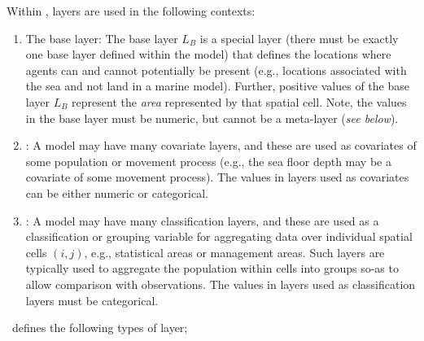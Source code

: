 Within \IBM, layers are used in the following contexts:
\begin{enumerate}
	\item The base layer: The base layer $L_B$ is a special layer (there must be exactly one base layer defined within the model) that defines the locations where agents can and cannot potentially be present (e.g., locations associated with the sea and not land in a marine model). Further, positive values of the base layer $L_B$ represent the \emph{area} represented by that spatial cell. Note, the values in the base layer must be numeric, but cannot be a meta-layer (\emph{see below}).
	\item {}: A model may have many covariate layers, and these are used as covariates of some population or movement process (e.g., the sea floor depth may be a covariate of some movement process). The values in layers used as covariates can be either numeric or categorical.
	\item {}: A model may have many classification layers, and these are used as a classification or grouping variable for aggregating data over individual spatial cells $(i,j)$, e.g., statistical areas or management areas. Such layers are typically used to aggregate the population within cells into groups so-as to allow comparison with observations. The values in layers used as classification layers must be categorical.
\end{enumerate}

\IBM\ defines the following types of layer;

